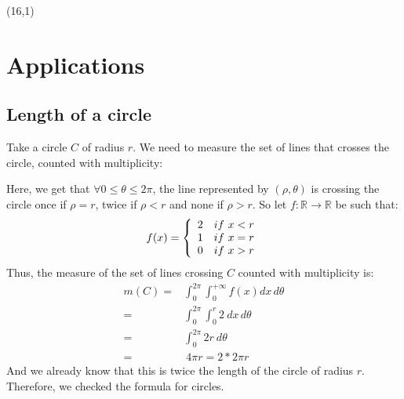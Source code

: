 \documentclass[a0]{a0poster}
\begin{document}
\begin{textblock}{7}
\begin{center}
\end{center}

\end{textblock}

\begin{textblock}{7}(16,1)

\section{Applications}
\subsection{Length of a circle}
Take a circle $C$ of radius $r$.
We need to measure the set of lines that crosses the circle, counted with multiplicity:


Here, we get that $\forall 0 \leq \theta \leq 2\pi$, the line represented by $(\rho, \theta)$ is crossing the circle once if $\rho = r$, twice if $\rho < r$ and none if $\rho > r$.
So let $f:\mathbb{R} \to \mathbb{R}$ be such that:
$$f(x) = \left\{
\begin{array}{r c l}
2 \quad if \ x < r\\
1 \quad if \ x = r\\
0 \quad if \ x > r
\end{array}
\right.$$
Thus, the measure of the set of lines crossing $C$ counted with multiplicity is:
\begin{align}
m(C) =& \int_0^{2\pi}\int_0^{+\infty} f(x) dx\,d\theta \\
=& \int_0^{2\pi}\int_0^{r} 2 \ dx\,d\theta \\
=& \int_0^{2\pi} 2 r \ d\theta \\
=& \ 4 \pi r = 2* 2\pi r
\end{align}
And we already know that this is twice the length of the circle of radius $r$.
Therefore, we checked the formula for circles.




\end{textblock}
\end{document}
